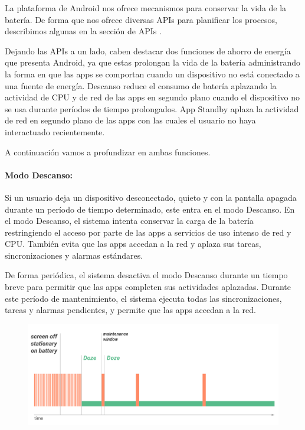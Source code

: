 

La plataforma de Android nos ofrece mecanismos para conservar la vida de la batería. De forma que nos ofrece diversas APIs para planificar los procesos, describimos algunas en la sección de APIs \cite{jobdispatcher}.

Dejando las APIs a un lado, caben destacar  dos funciones de ahorro de energía que presenta Android, ya que estas prolongan la vida de la batería administrando la forma en que las apps se comportan cuando un dispositivo no está conectado a una fuente de energía. Descanso reduce el consumo de batería aplazando la actividad de CPU y de red de las apps en segundo plano cuando el dispositivo no se usa durante períodos de tiempo prolongados. App Standby aplaza la actividad de red en segundo plano de las apps con las cuales el usuario no haya interactuado recientemente.

A continuación vamos a profundizar en ambas funciones.

\paragraph{Modo Descanso:}

Si un usuario deja un dispositivo desconectado, quieto y con la pantalla apagada durante un período de tiempo determinado, este entra en el modo Descanso. En el modo Descanso, el sistema intenta conservar la carga de la batería restringiendo el acceso por parte de las apps a servicios de uso intenso de red y CPU. También evita que las apps accedan a la red y aplaza sus tareas, sincronizaciones y alarmas estándares.

De forma periódica, el sistema desactiva el modo Descanso durante un tiempo breve para permitir que las apps completen sus actividades aplazadas. Durante este período de mantenimiento, el sistema ejecuta todas las sincronizaciones, tareas y alarmas pendientes, y permite que las apps accedan a la red.
\begin{figure}[h]
\includegraphics[scale=0.20]{imagenes/doze.png} 
\end{figure}



